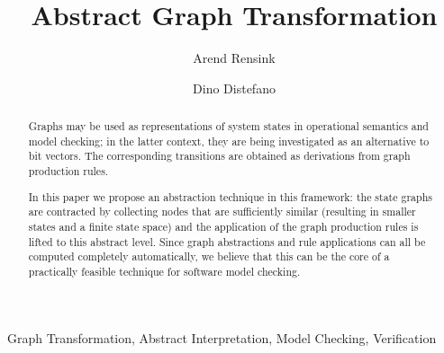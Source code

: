 \begin{frontmatter}
\title{Abstract Graph Transformation}
\author{Arend Rensink}
\address{
    Department of Computer Science, University of Twente \\
    \texttt{rensink@cs.utwente.nl}}
\author{Dino Distefano}
\address{Department of Computer Science, Queen Mary University of London \\
    \texttt{ddino@dcs.qmul.ac.uk}}

\begin{abstract}
  Graphs may be used as representations of system states in
  operational semantics and model checking; in the latter context, they are
  being investigated as an alternative to bit vectors. The corresponding
  transitions are obtained as derivations from graph production rules. 
  
  In this paper we propose an abstraction technique in this framework: the
  state graphs are contracted by collecting nodes that are sufficiently similar
  (resulting in smaller states and a finite state space) and the
  application of the graph production rules is lifted to this abstract level.
  Since graph abstractions and rule applications can all be computed completely
  automatically, we believe that this can be the core of a practically feasible
  technique for software model checking.
\end{abstract}
\begin{keyword}
  Graph Transformation, Abstract Interpretation, Model Checking, Verification
\end{keyword}
\end{frontmatter}


